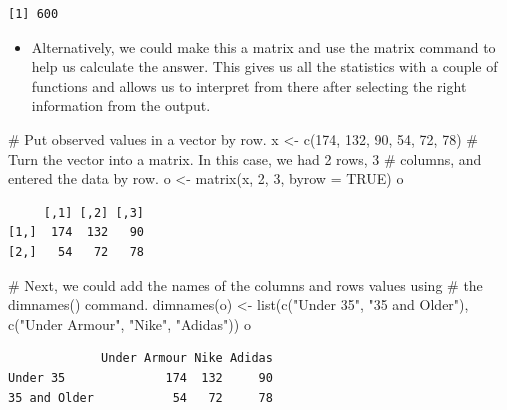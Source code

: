 \documentclass[
  letterpaper,
  DIV=11,
  numbers=noendperiod]{scrreprt}
\newenvironment{Shaded}{\begin{snugshade}}{\end{snugshade}}
\newcommand{\AttributeTok}[1]{\textcolor[rgb]{0.40,0.45,0.13}{#1}}
\newcommand{\CommentTok}[1]{\textcolor[rgb]{0.37,0.37,0.37}{#1}}
\newcommand{\ConstantTok}[1]{\textcolor[rgb]{0.56,0.35,0.01}{#1}}
\newcommand{\DecValTok}[1]{\textcolor[rgb]{0.68,0.00,0.00}{#1}}
\newcommand{\FunctionTok}[1]{\textcolor[rgb]{0.28,0.35,0.67}{#1}}
\newcommand{\NormalTok}[1]{\textcolor[rgb]{0.00,0.23,0.31}{#1}}
\newcommand{\OtherTok}[1]{\textcolor[rgb]{0.00,0.23,0.31}{#1}}
\newcommand{\StringTok}[1]{\textcolor[rgb]{0.13,0.47,0.30}{#1}}
\providecommand{\tightlist}{%
  \setlength{\itemsep}{0pt}\setlength{\parskip}{0pt}}\usepackage{longtable,booktabs,array}
\begin{document}
\begin{verbatim}
[1] 600
\end{verbatim}

\begin{itemize}
\tightlist
\item
  Alternatively, we could make this a matrix and use the matrix command
  to help us calculate the answer. This gives us all the statistics with
  a couple of functions and allows us to interpret from there after
  selecting the right information from the output.
\end{itemize}

\begin{Shaded}
\begin{Highlighting}[]
\CommentTok{\# Put observed values in a vector by row.}
\NormalTok{x }\OtherTok{\textless{}{-}} \FunctionTok{c}\NormalTok{(}\DecValTok{174}\NormalTok{, }\DecValTok{132}\NormalTok{, }\DecValTok{90}\NormalTok{, }\DecValTok{54}\NormalTok{, }\DecValTok{72}\NormalTok{, }\DecValTok{78}\NormalTok{)}
\CommentTok{\# Turn the vector into a matrix. In this case, we had 2 rows, 3}
\CommentTok{\# columns, and entered the data by row.}
\NormalTok{o }\OtherTok{\textless{}{-}} \FunctionTok{matrix}\NormalTok{(x, }\DecValTok{2}\NormalTok{, }\DecValTok{3}\NormalTok{, }\AttributeTok{byrow =} \ConstantTok{TRUE}\NormalTok{)}
\NormalTok{o}
\end{Highlighting}
\end{Shaded}

\begin{verbatim}
     [,1] [,2] [,3]
[1,]  174  132   90
[2,]   54   72   78
\end{verbatim}

\begin{Shaded}
\begin{Highlighting}[]
\CommentTok{\# Next, we could add the names of the columns and rows values using}
\CommentTok{\# the dimnames() command.}
\FunctionTok{dimnames}\NormalTok{(o) }\OtherTok{\textless{}{-}} \FunctionTok{list}\NormalTok{(}\FunctionTok{c}\NormalTok{(}\StringTok{"Under 35"}\NormalTok{, }\StringTok{"35 and Older"}\NormalTok{), }\FunctionTok{c}\NormalTok{(}\StringTok{"Under Armour"}\NormalTok{, }\StringTok{"Nike"}\NormalTok{,}
    \StringTok{"Adidas"}\NormalTok{))}
\NormalTok{o}
\end{Highlighting}
\end{Shaded}

\begin{verbatim}
             Under Armour Nike Adidas
Under 35              174  132     90
35 and Older           54   72     78
\end{verbatim}
\end{document}
